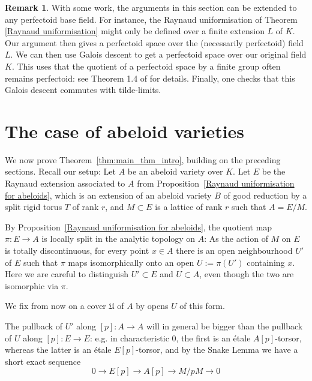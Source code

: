 \documentclass[10pt,oneside]{amsart}
\theoremstyle{definition}
\newtheorem{remark}[theorem]{Remark}
\begin{document}
	\begin{remark}\label{general fields for E}
	With some work, the arguments in this section can be extended to any perfectoid base field. For instance, the Raynaud uniformisation of Theorem \ref{Raynaud uniformisation} might only be defined over a finite extension $L$ of $K$. Our argument then gives a perfectoid space over the (necessarily perfectoid) field $L$. We can then use Galois descent to get a perfectoid space over our original field $K$. This uses that the quotient of a perfectoid space by a finite group often remains perfectoid: see Theorem 1.4 of \cite{Hansen_quotients} for details. Finally, one checks that this Galois descent commutes with tilde-limits. 
	\end{remark}

	
	\section{The case of abeloid varieties}\label{The case of abeloid varieties}
	We now prove Theorem~\ref{thm:main_thm_intro}, building on the preceding sections. Recall our setup: Let $A$ be an abeloid variety over $K$. Let $E$ be the Raynaud extension associated to $A$ from Proposition~\ref{Raynaud uniformisation for abeloids}, which is an extension of an abeloid variety $B$ of good reduction by a split rigid torus $T$ of rank $r$, and $M\subset E$  is a lattice of rank $r$ such that $A=E/M$. 

By Proposition~\ref{Raynaud uniformisation for abeloids}, the quotient map $\pi\colon E\to A$ is locally split in the analytic topology on $A$: As the action of $M$ on $E$ is totally discontinuous, for every point  $x\in A$ there is an open neighbourhood $U'$ of $E$ such that $\pi$ maps isomorphically onto an open $U:=\pi(U')$ containing $x$. Here we are careful to distinguish $U'\subset E$ and $U\subset A$, even though the two are isomorphic via $\pi$.

We fix from now on a cover $\mathfrak U$ of $A$ by opens $U$ of this form.

The pullback of $U'$ along $[p]\colon A\to A$ will in general be bigger than the pullback of $U$ along $[p]:E\to E$: e.g. in characteristic 0, the first is an \'etale $A[p]$-torsor, whereas  the latter is an \'etale $E[p]$-torsor, and by the Snake Lemma we have a short exact sequence
\[0\to E[p]\to A[p]\to M/pM\to 0\]
\end{document}
